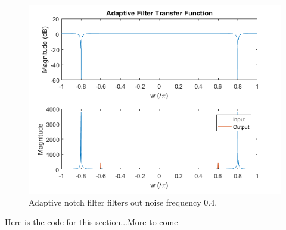 \documentclass[12pt, letterpaper]{article}
\begin{document}
	\begin{figure}[H]
		\centering
		\includegraphics[width=\textwidth]{pAiot}
		
		\caption{Adaptive notch filter filters out noise frequency 0.4.}	
	\end{figure}

	Here is the code for this section...More to come
	
\end{document}

